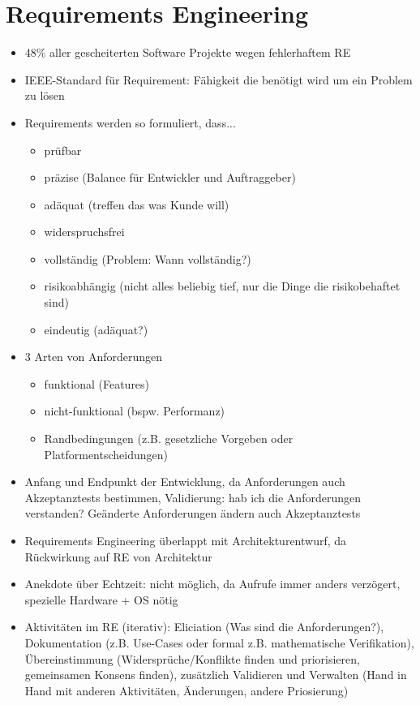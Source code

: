 \documentclass[paper=a4, fontsize=11pt]{scrartcl} %
\numberwithin{equation}{section} %
\numberwithin{figure}{section} %
\numberwithin{table}{section} %
\begin{document}
\section{Requirements Engineering}

\begin{itemize}
  \item 48\% aller gescheiterten Software Projekte wegen fehlerhaftem RE
  \item IEEE-Standard für Requirement: Fähigkeit die benötigt wird um ein Problem zu lösen
  \item Requirements werden so formuliert, dass...
  \begin{itemize}
    \item prüfbar
    \item präzise (Balance für Entwickler und Auftraggeber)
    \item adäquat (treffen das was Kunde will)
    \item widerspruchsfrei
    \item vollständig (Problem: Wann vollständig?)
    \item risikoabhängig (nicht alles beliebig tief, nur die Dinge die risikobehaftet sind)
    \item eindeutig (adäquat?)
  \end{itemize}
  \item 3 Arten von Anforderungen
  \begin{itemize}
    \item funktional (Features)
    \item nicht-funktional (bspw. Performanz)
    \item Randbedingungen (z.B. gesetzliche Vorgeben oder Platformentscheidungen)
  \end{itemize}
  \item Anfang und Endpunkt der Entwicklung, da Anforderungen auch Akzeptanztests bestimmen, Validierung: hab ich die Anforderungen verstanden? Geänderte Anforderungen ändern auch Akzeptanztests
  \item Requirements Engineering überlappt mit Architekturentwurf, da Rückwirkung auf RE von Architektur
  \item Anekdote über Echtzeit: nicht möglich, da Aufrufe immer anders verzögert, spezielle Hardware + OS nötig
  \item Aktivitäten im RE (iterativ): Eliciation (Was sind die Anforderungen?), Dokumentation (z.B. Use-Cases oder formal z.B. mathematische Verifikation), Übereinstimmung (Widersprüche/Konflikte finden und priorisieren, gemeinsamen Konsens finden), zusätzlich Validieren und Verwalten (Hand in Hand mit anderen Aktivitäten, Änderungen, andere Priosierung)

\end{itemize}
\end{document}
